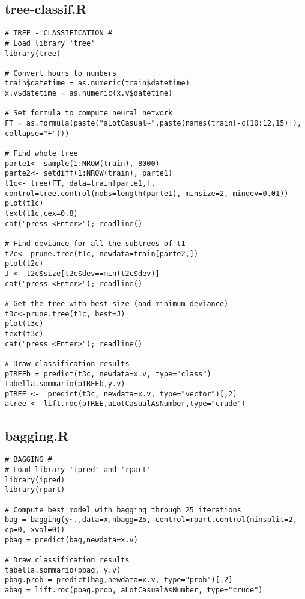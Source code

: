 \subsection{tree-classif.R}\label{sec:script-tree-classif}
\begin{verbatim}
# TREE - CLASSIFICATION #
# Load library 'tree'
library(tree)

# Convert hours to numbers
train$datetime = as.numeric(train$datetime)
x.v$datetime = as.numeric(x.v$datetime)

# Set formula to compute neural network
FT = as.formula(paste("aLotCasual~",paste(names(train[-c(10:12,15)]), collapse="+")))

# Find whole tree
parte1<- sample(1:NROW(train), 8000) 
parte2<- setdiff(1:NROW(train), parte1)
t1c<- tree(FT, data=train[parte1,], control=tree.control(nobs=length(parte1), minsize=2, mindev=0.01))
plot(t1c)
text(t1c,cex=0.8)
cat("press <Enter>"); readline()

# Find deviance for all the subtrees of t1
t2c<- prune.tree(t1c, newdata=train[parte2,])
plot(t2c)
J <- t2c$size[t2c$dev==min(t2c$dev)]
cat("press <Enter>"); readline()

# Get the tree with best size (and minimum deviance)
t3c<-prune.tree(t1c, best=J)
plot(t3c)
text(t3c)
cat("press <Enter>"); readline()

# Draw classification results
pTREEb = predict(t3c, newdata=x.v, type="class")
tabella.sommario(pTREEb,y.v)
pTREE <-  predict(t3c, newdata=x.v, type="vector")[,2]
atree <- lift.roc(pTREE,aLotCasualAsNumber,type="crude")
\end{verbatim}

\subsection{bagging.R}\label{sec:script-bagging}
\begin{verbatim}
# BAGGING #
# Load library 'ipred' and 'rpart'
library(ipred)
library(rpart)

# Compute best model with bagging through 25 iterations
bag = bagging(y~.,data=x,nbagg=25, control=rpart.control(minsplit=2, cp=0, xval=0))
pbag = predict(bag,newdata=x.v)

# Draw classification results
tabella.sommario(pbag, y.v)
pbag.prob = predict(bag,newdata=x.v, type="prob")[,2]
abag = lift.roc(pbag.prob, aLotCasualAsNumber, type="crude")
\end{verbatim}

